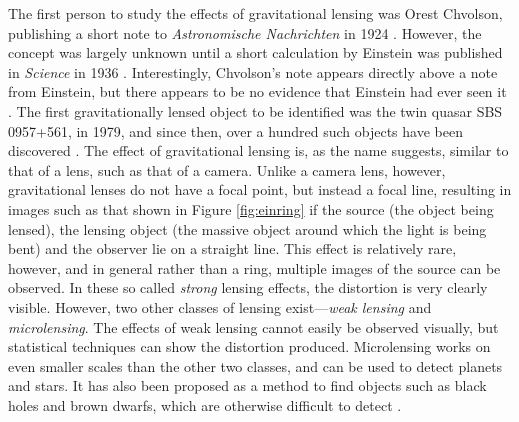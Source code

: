 \documentclass[a4paper,11pt]{article}
\begin{document}
The first person to study the effects of gravitational lensing was Orest
Chvolson, publishing a short note to \emph{Astronomische Nachrichten} in 1924
\cite{chwolsonlensing}. However, the concept was largely unknown until a short
calculation by Einstein was published in \emph{Science} in 1936
\cite{einsteinlensing}. Interestingly, Chvolson's note appears directly above a
note from Einstein, but there appears to be no evidence that Einstein had ever
seen it \cite{einsteinchwolson,renn2000eclipses}. The first gravitationally
lensed object to be identified was the twin quasar SBS 0957+561, in 1979, and
since then, over a hundred such objects have been discovered
\cite{firstlens,gravlenscount}. The effect of gravitational lensing is, as the
name suggests, similar to that of a lens, such as that of a camera. Unlike a
camera lens, however, gravitational lenses do not have a focal point, but
instead a focal line, resulting in images such as that shown in Figure
\ref{fig:einring} if the source (the object being lensed), the lensing object
(the massive object around which the light is being bent) and the observer lie on a
straight line. This effect is relatively rare, however, and in general rather
than a ring, multiple images of the source can be observed. In these so called
\emph{strong} lensing effects, the distortion is very clearly visible. However,
two other classes of lensing exist---\emph{weak lensing} and
\emph{microlensing}.  The effects of weak lensing cannot easily be observed
visually, but statistical techniques can show the distortion
produced. Microlensing works on even smaller scales than the other two classes,
and can be used to detect planets and stars. It has also been proposed as a
method to find objects such as black holes and brown dwarfs, which are otherwise
difficult to detect \cite{schneider2006gravitational}.
\end{document}
